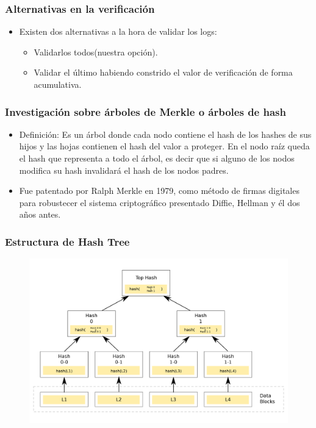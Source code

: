 \documentclass[10pt, a4paper,english,spanish]{beamer}
\begin{document}
\begin{frame}
\frametitle{Alternativas en la verificación}
\begin{itemize}
\item Existen dos alternativas a la hora de validar los logs:
\begin{itemize}
\item Validarlos todos(nuestra opción).
\item Validar el último habiendo constrido el valor de verificación de forma acumulativa.
\end{itemize}
\end{itemize}
\end{frame}


\begin{frame}
\frametitle{Investigaci\'on sobre \'arboles de Merkle o \'arboles de hash}
\begin{itemize}

\item Definici\'on: Es un \'arbol donde cada nodo contiene el hash de los hashes de sus hijos y las hojas contienen el hash del valor a proteger. En el nodo ra\'iz queda el hash que representa a todo el \'arbol, es decir que si alguno de los nodos modifica su hash invalidar\'a el hash de los nodos padres.
\item Fue patentado por Ralph Merkle en 1979, como m\'etodo de firmas digitales para robustecer el sistema criptogr\'afico presentado Diffie, Hellman y \'el dos a\~nos antes.

\end{itemize}
\end{frame}


\begin{frame}
\frametitle{Estructura de Hash Tree}

\begin{figure}
  \includegraphics[width=\linewidth]{imagenes/hash_tree.png}
\end{figure}

\end{frame}
\end{document}
